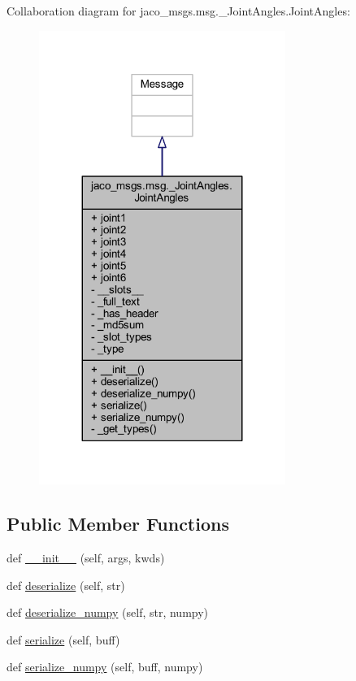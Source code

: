 Collaboration diagram for jaco\+\_\+msgs.\+msg.\+\_\+\+Joint\+Angles.\+Joint\+Angles\+:
\nopagebreak
\begin{figure}[H]
\begin{center}
\leavevmode
\includegraphics[width=227pt]{d7/d08/classjaco__msgs_1_1msg_1_1__JointAngles_1_1JointAngles__coll__graph}
\end{center}
\end{figure}
\subsection*{Public Member Functions}
\begin{DoxyCompactItemize}
\item 
def \hyperlink{classjaco__msgs_1_1msg_1_1__JointAngles_1_1JointAngles_adeda70762f62ddae96cad154f02c26dd}{\+\_\+\+\_\+init\+\_\+\+\_\+} (self, args, kwds)
\item 
def \hyperlink{classjaco__msgs_1_1msg_1_1__JointAngles_1_1JointAngles_a8728f894f44f6e5fc6ad6a05a64c568c}{deserialize} (self, str)
\item 
def \hyperlink{classjaco__msgs_1_1msg_1_1__JointAngles_1_1JointAngles_a7edb501f96eae105529a2c5dd73da2cd}{deserialize\+\_\+numpy} (self, str, numpy)
\item 
def \hyperlink{classjaco__msgs_1_1msg_1_1__JointAngles_1_1JointAngles_ace5466455a513a289e37284eec8ed7a4}{serialize} (self, buff)
\item 
def \hyperlink{classjaco__msgs_1_1msg_1_1__JointAngles_1_1JointAngles_a083662b0b934ff0e3b1add4a1f23a1e4}{serialize\+\_\+numpy} (self, buff, numpy)
\end{DoxyCompactItemize}
